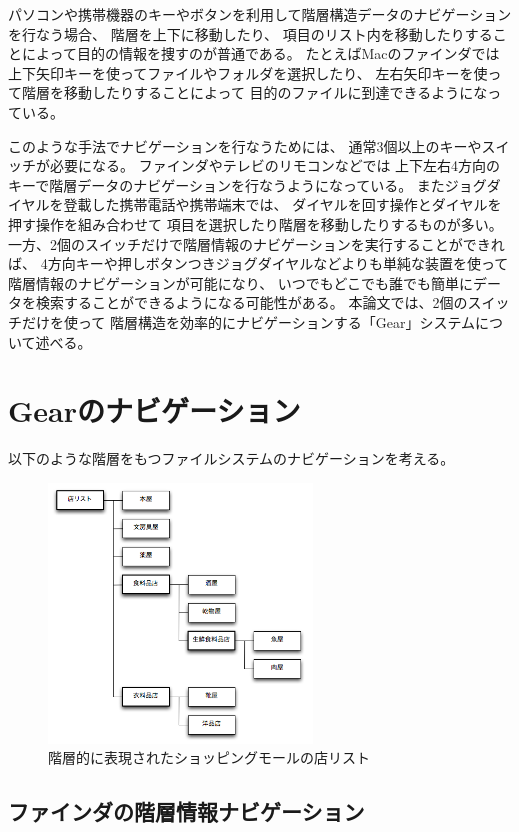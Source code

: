\documentclass[twoside]{wiss}
\def\GEAR{\textsf{Gear}}
\begin{document}
パソコンや携帯機器のキーやボタンを利用して階層構造データのナビゲーションを行なう場合、
階層を上下に移動したり、
項目のリスト内を移動したりすることによって目的の情報を捜すのが普通である。
たとえばMacのファインダでは
上下矢印キーを使ってファイルやフォルダを選択したり、
左右矢印キーを使って階層を移動したりすることによって
目的のファイルに到達できるようになっている。

このような手法でナビゲーションを行なうためには、
通常3個以上のキーやスイッチが必要になる。
%
ファインダやテレビのリモコンなどでは
上下左右4方向のキーで階層データのナビゲーションを行なうようになっている。
またジョグダイヤルを登載した携帯電話や携帯端末では、
ダイヤルを回す操作とダイヤルを押す操作を組み合わせて
項目を選択したり階層を移動したりするものが多い。
%
一方、2個のスイッチだけで階層情報のナビゲーションを実行することができれば、
4方向キーや押しボタンつきジョグダイヤルなどよりも単純な装置を使って
階層情報のナビゲーションが可能になり、
いつでもどこでも誰でも簡単にデータを検索することができるようになる可能性がある。
%
本論文では、2個のスイッチだけを使って
階層構造を効率的にナビゲーションする「{\GEAR}」システムについて述べる。

\section{{\GEAR}のナビゲーション}
\label{description}

以下のような階層をもつファイルシステムのナビゲーションを考える。

\begin{figure}[H]
\centerline{\includegraphics[width=70mm,bb=0 0 509 502]{figures/ae9216b00626f9c4eea44cc380f25886.png}}
\caption{階層的に表現されたショッピングモールの店リスト}
\label{screenshot1}
\end{figure}

\subsection{ファインダの階層情報ナビゲーション}
\end{document}
